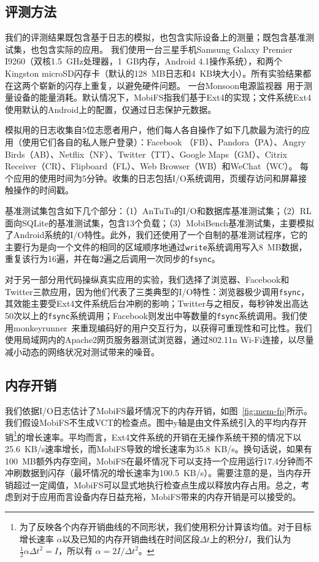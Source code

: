 \subsection{评测方法} \label{vct:method}

我们的评测结果既包含基于日志的模拟，也包含实际设备上的测量；既包含基准测试集，也包含实际的应用。
我们使用一台三星手机Samsung
Galaxy Premier I9260（双核1.5~GHz处理器，1~GB内存，Android 4.1操作系统），和两个Kingston microSD闪存卡（默认的128~MB日志和4~KB块大小）。所有实验结果都在这两个崭新的闪存上重复，以避免硬件问题。
一台Monsoon电源监视器~\cite{Monsoon:PM}用于测量设备的能量消耗。默认情况下，MobiFS指我们基于Ext4的实现；文件系统Ext4使用默认的Android上的配置，仅通过日志保护元数据。

模拟用的日志收集自5位志愿者用户，他们每人各自操作了如下几款最为流行的应用（使用它们各自的私人账户登录）：Facebook
（FB）、Pandora（PA）、Angry Birds（AB）、Netflix（NF）、Twitter（TT）、Google Maps（GM）、Citrix Receiver（CR）、Flipboard（FL）、Web Browser（WB）和WeChat（WC）。 每个应用的使用时间为5分钟。收集的日志包括I/O系统调用，页缓存访问和屏幕接触操作的时间戳。

基准测试集包含如下几个部分：（1）AnTuTu的I/O和数据库基准测试集；（2）RL面向SQLite的基准测试集，包含13个负载；（3）MobiBench基准测试集，主要模拟了Android系统的I/O特性。此外，我们还使用了一个自制的基准测试程序，它的主要行为是向一个文件的相同的区域顺序地通过\texttt{write}系统调用写入8~MB数据，重复该行为16遍，并在每2遍之后调用一次同步的\texttt{fsync}。

对于另一部分用代码操纵真实应用的实验，我们选择了浏览器、Facebook和Twitter三款应用，因为他们代表了三类典型的I/O特性：浏览器极少调用\texttt{fsync}，其效能主要受Ext4文件系统后台冲刷的影响；Twitter与之相反，每秒钟发出高达50次以上的\texttt{fsync}系统调用；Facebook则发出中等数量的\texttt{fsync}系统调用。我们使用monkeyrunner~\cite{Monkeyrunner}来重现编码好的用户交互行为，以获得可重现性和可比性。我们使用局域网内的Apache2网页服务器测试浏览器，通过802.11n Wi-Fi连接，以尽量减小动态的网络状况对测试带来的噪音。

\subsection{内存开销} \label{vct:mem-fp}

我们依据I/O日志估计了MobiFS最坏情况下的内存开销，如图~\ref{fig:mem-fp}所示。
我们假设MobiFS不生成VCT的检查点。图中y轴是由文件系统引入的平均内存开销\footnote{为了反映各个内存开销曲线的不同形状，我们使用积分计算该均值。对于目标增长速率
$\alpha$以及已知的内存开销曲线在时间区段${\Delta t}$上的积分$I$，我们认为$\frac{1}{2}\alpha{\Delta t}^2 = I$，所以有
$\alpha=2I/{\Delta t}^2$。}的增长速率。平均而言，Ext4文件系统的开销在无操作系统干预的情况下以25.6~KB/s速率增长，而MobiFS导致的增长速率为35.8~KB/s。换句话说，如果有100~MB额外内存空间，MobiFS在最坏情况下可以支持一个应用运行17.4分钟而不冲刷数据到闪存（最坏情况的增长速率为100.5~KB/s）。需要注意的是，当内存开销超过一定阈值，MobiFS可以显式地执行检查点生成以释放内存占用。总之，考虑到对于应用而言设备内存日益充裕，MobiFS带来的内存开销是可以接受的。

